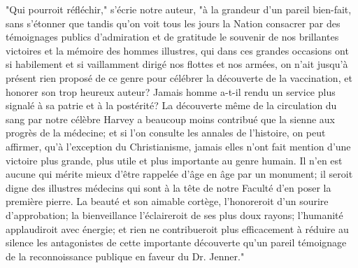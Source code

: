 "Qui pourroit réfléchir," s'écrie notre auteur, "à la grandeur d'un pareil bien-fait, sans s'étonner que tandis qu'on voit tous les jours la Nation consacrer par des témoignages publics d'admiration et de gratitude le souvenir de nos brillantes victoires et la mémoire des hommes illustres, qui dans ces grandes occasions ont si habilement et si vaillamment dirigé nos flottes et nos armées, on n'ait jusqu'à présent rien proposé de ce genre pour célébrer la découverte de la vaccination, et honorer son trop heureux auteur? Jamais homme a-t-il rendu un service plus signalé à sa patrie et à la postérité? La découverte même de\setcounter{page}{387} la circulation du sang par notre célèbre Harvey a beaucoup moins contribué que la sienne aux progrès de la médecine; et si l'on consulte les annales de l'histoire, on peut affirmer, qu'à l'exception du Christianisme, jamais elles n'ont fait mention d'une victoire plus grande, plus utile et plus importante au genre humain. Il n'en est aucune qui mérite mieux d'être rappelée d'âge en âge par un monument; il seroit digne des illustres médecins qui sont à la tête de notre Faculté d'en poser la première pierre. La beauté et son aimable cortège, l'honoreroit d'un sourire d'approbation; la bienveillance l'éclaireroit de ses plus doux rayons; l'humanité applaudiroit avec énergie; et rien ne contribueroit plus efficacement à réduire au silence les antagonistes de cette importante découverte qu'un pareil témoignage de la reconnoissance publique en faveur du Dr. Jenner."
